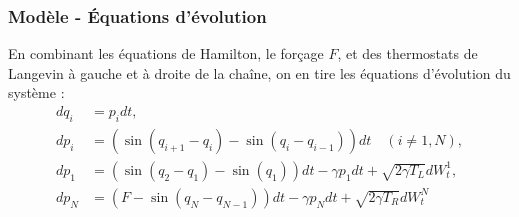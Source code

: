 \begin{frame}

    \frametitle{Modèle - Équations d'évolution}

    En combinant les équations de Hamilton, le forçage $F$, et des
    thermostats de Langevin à gauche et à droite de la chaîne,
    on en tire les équations d'évolution du système :
    \begin{align*}
        dq_i &= p_i dt, \\
        dp_i &= (\sin(q_{i+1} - q_i) - \sin(q_i - q_{i-1}))dt \quad (i \neq 1, N), \\
        dp_1 &= (\sin(q_2 - q_1) - \sin(q_1))dt - \gamma p_1 dt + \sqrt{2 \gamma T_L} dW_t^1, \\
        dp_N &= (F - \sin(q_N - q_{N-1})) dt - \gamma p_N dt + \sqrt{2 \gamma T_R} dW_t^N
    \end{align*}



\end{frame}


